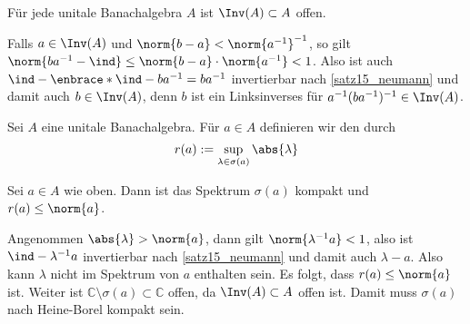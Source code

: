 \begin{korollar}[{name=[Invertierbare Elemente bilden offene Menge]},label=inv_offen]
	Für jede unitale Banachalgebra $A$ ist $\Inv(A) \subset A$ offen.
\end{korollar}
\begin{beweis}
	Falls $a \in \Inv(A)$ und $\norm{b-a} < \norm{a^{-1}}^{-1}$, so gilt $\norm{b a^{-1} -\ind} \le \norm{b-a} \cdot \norm{a^{-1}}<1$.  Also ist auch
	$\ind- \enbrace*{\ind- ba^{-1}} = ba^{-1}$ invertierbar nach \autoref{satz15_neumann} und damit auch $b \in \Inv(A)$, denn $b$ ist ein Linksinverses für 
	$a^{-1}(ba^{-1})^{-1} \in \Inv(A)$.
\end{beweis}

\begin{definition}[{name=[Spektralradius]}]
	Sei $A$ eine unitale Banachalgebra. Für $a \in A$ definieren wir den  durch
	\[
		r(a) := \sup_{\lambda \in \sigma(a)} \abs{\lambda} 
	\] 
\end{definition}

\begin{proposition}[{name=[Spektrum ist kompakt und Spektralradius durch Norm beschränkt]},label=spec_kompakt]
	Sei $a \in A$ wie oben. Dann ist das Spektrum $\sigma(a)$ kompakt und $r(a) \le \norm{a}$.
\end{proposition}
\begin{beweis}
	Angenommen $\abs{\lambda} > \norm{a}$, dann gilt $\norm{\lambda^{-1} a} < 1$, also ist $\ind- \lambda^{-1} a$ invertierbar nach \autoref{satz15_neumann} und 
	damit auch $\lambda -a $. Also kann $\lambda$ nicht im Spektrum von $a$ enthalten sein. 
	Es folgt, dass $r(a) \le \norm{a}$ ist. 	
	Weiter ist $\mathbb{C} \setminus \sigma(a) \subset \mathbb{C}$ offen, da $\Inv(A) \subset A$ offen ist. Damit muss $\sigma(a)$ nach Heine-Borel kompakt sein.
\end{beweis}

